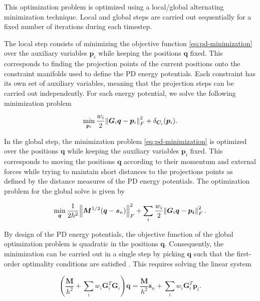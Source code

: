 \noindent This optimization problem is optimized using a local/global alternating minimization technique. Local and global steps 
are carried out sequentially for a fixed number of iterations during each timestep. 

The local step consists of minimizing the objective function \cref{eq:pd-minimization} over 
the auxiliary variables $\bm{p}_i$ while keeping the positions $\bm{q}$ fixed. This corresponds to finding the projection points of 
the current positions onto the constraint manifolds used to define the PD energy potentials. Each constraint has its own 
set of auxiliary variables, meaning that the projection steps can be carried out independently. For each energy potential, we solve the 
following minimization problem

\begin{equation}\label{eq:pd-local-minimization}
    \min_{\bm{p}_i} \frac{w_i}{2}\norm{\bm{G}_i\bm{q} - \bm{p}_i}^2_F + \delta_{\bm{C}_i}(\bm{p}_i).
\end{equation}

In the global step, the minimization problem \cref{eq:pd-minimization} is optimized over the positions $\bm{q}$ while keeping the auxiliary 
variables $\bm{p}_i$ fixed.
This corresponds to moving the positions $\bm{q}$ according to their momentum and external forces while trying to maintain short distances
to the projections points as defined by the distance measures of the PD energy potentials. The optimization problem for the global solve is 
given by

\begin{equation}\label{eq:pd-global-minimization}
    \min_{\bm{q}} \frac{1}{2h^2} \norm{\bm{M}^{1/2}(\bm{q} - \bm{s}_n)}^2_F + \sum_i \frac{w_i}{2} \norm{\bm{G}_i\bm{q} - \bm{p_i}}^2_F.
\end{equation}

\noindent By design of the PD energy potentials, the objective function of the global optimization problem is quadratic in the positions 
$\bm{q}$. Consequently, the minimization can be carried out in a single step by picking $\bm{q}$ such that the first-order optimality 
conditions are satisfied \cite{nocedal2006}. This requires solving the linear system

\begin{equation}\label{eq:pd-global-system}
    (\frac{\bm{M}}{h^2} + \sum_i w_i \bm{G}_i^T \bm{G}_i)\bm{q} = \frac{\bm{M}}{h^2}\bm{s}_n + \sum_i w_i \bm{G}_i^T \bm{p}_i.
\end{equation}

